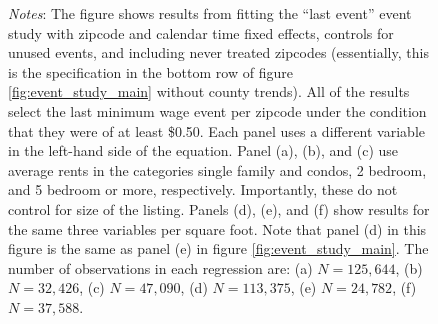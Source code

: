 \begin{figure}[h!]
\begin{minipage}{.95\textwidth}
		\textit{Notes}: The figure shows results from fitting the ``last event'' event study with zipcode and calendar time fixed effects, controls for unused events, and including never treated zipcodes (essentially, this is the specification in the bottom row of figure \ref{fig:event_study_main} without county trends). All of the results select the last minimum wage event per zipcode under the condition that they were of at least \$0.50. Each panel uses a different variable in the left-hand side of the equation. Panel (a), (b), and (c) use average rents in the categories single family and condos, 2 bedroom, and 5 bedroom or more, respectively. Importantly, these do not control for size of the listing. Panels (d), (e), and (f) show results for the same three variables per square foot. Note that panel (d) in this figure is the same as panel (e) in figure \ref{fig:event_study_main}. The number of observations in each regression are: (a) $N = 125,644$, (b) $N = 32,426$, (c) $N = 47,090$, (d) $N = 113,375$, (e) $N = 24,782$, (f) $N = 37,588$.
	\end{minipage}
\end{figure}


